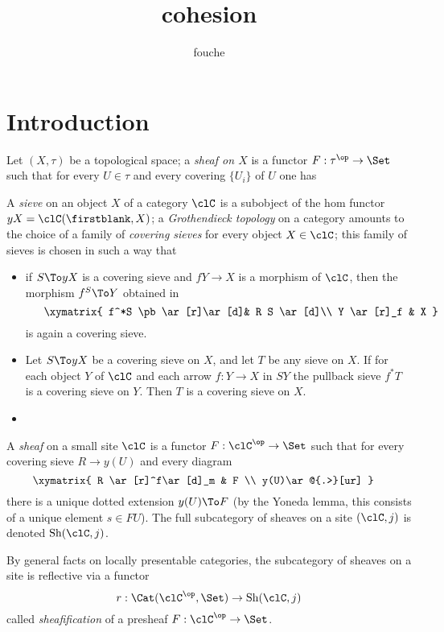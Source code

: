 \documentclass{amsart}
\author{fouche}
\title{cohesion}
\def\xym#1{\vcenter{\xymatrix{#1}}}
\begin{document}
\maketitle
\section{Introduction}
\begin{definition}

\end{definition}
\begin{definition}
  Let $(X,\tau)$ be a topological space; a \emph{sheaf on $X$} is a functor $F : \tau^\op\to \Set$ such that for every $U\in\tau$ and every covering $\{U_i\}$ of $U$ one has
\end{definition}
\begin{definition}
  A \emph{sieve} on an object $X$ of a category $\clC$ is a subobject of the hom functor $yX = \clC(\firstblank,X)$; a \emph{Grothendieck topology} on a category amounts to the choice of a family of \emph{covering sieves} for every object $X\in\clC$; this family of sieves is chosen in such a way that
  \begin{itemize}
  \item if $S\To yX$ is a covering sieve and $f Y \to X$ is a morphism of $\clC$, then the morphism $f^S \To Y$ obtained in
  \[\xym{
  f^*S \pb \ar[r]\ar[d]& R S \ar[d]\\
  Y \ar[r]_f & X
  }\]
  is again a covering sieve.
  \item Let $S \To yX$ be a covering sieve on $X$, and let $T$ be any sieve on $X$. If for each object $Y$ of $\clC$ and each arrow $f : Y \to X$ in $SY$ the pullback sieve $f^*T$ is a covering sieve on $Y$. Then $T$ is a covering sieve on $X$.
    \item
  \end{itemize}
\end{definition}
\begin{definition}
  A \emph{sheaf} on a small site $\clC$ is a functor $F : \clC^\op\to\Set$ such that for every covering sieve $R \to y(U)$ and every diagram
  \[\xym{
  R \ar[r]^f\ar[d]_m & F \\
  y(U)\ar@{.>}[ur]
  }\]
  there is a unique dotted extension $y(U) \To F$ (by the Yoneda lemma, this consists of a unique element $s\in FU$). The full subcategory of sheaves on a site $(\clC,j)$ is denoted $\text{Sh}(\clC,j)$.
\end{definition}
By general facts on locally presentable categories, the subcategory of sheaves on a site is reflective via a functor
\[
r : \Cat(\clC^\op,\Set) \to \text{Sh}(\clC,j)
\] called \emph{sheafification} of a presheaf $F : \clC^\op\to \Set$.
\end{document}
